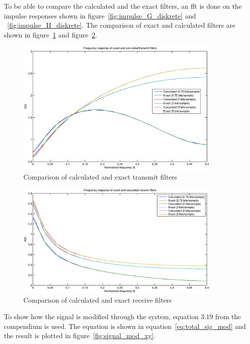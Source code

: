 	To be able to compare the calculated and the exact filters, an fft is done on the impulse responses shown in figure~\ref{fig:impulse_G_diskrete} and ~\ref{fig:impulse_H_diskrete}. The comparison of exact and calculated filters are shown in figure~\ref{fig:freq_comp_G} and figure~\ref{fig:freq_comp_H}.
	
	\begin{figure}[h]
	  \centering
	  \includegraphics[width=0.9\textwidth]{img/Oppgave2b_freq_G}
	  \caption{Comparison of calculated and exact transmit filters}
	  \label{fig:freq_comp_G}
	\end{figure}
	
	\begin{figure}[h]
	  \centering
	  \includegraphics[width=0.9\textwidth]{img/Oppgave2b_freq_H}
	  \caption{Comparison of calculated and exact receive filters}
	  \label{fig:freq_comp_H}
	\end{figure}
	
	To show how the signal is modified through the system, equation 3.19 from the compendium is used. The equation is shown in equation~\ref{eq:total_sig_mod} and the result is plotted in figure~\ref{fig:signal_mod_xy}.
	
